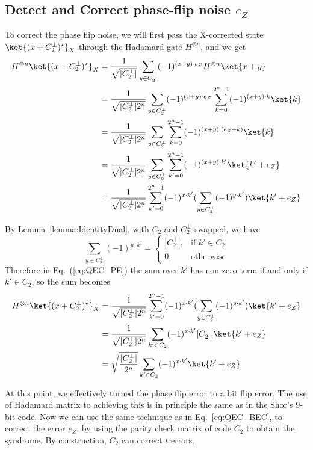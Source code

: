 \subsection{Detect and Correct phase-flip noise \(e_Z\)}
To correct the phase flip noise, we will first pass the X-corrected state \(\ket{(x + C_2^{\perp})^{\star}}_{X}\) through the Hadamard gate \(H^{\otimes n}\), and we get 
\begin{align}
    H^{\otimes n} \ket{(x + C_2^{\perp})^{\star}}_{X} &= \frac{1}{\sqrt{|C_2^{\perp}|}}\sum_{y \in C_2^{\perp}}  (-1)^{(x+y)\cdot e_Z} H^{\otimes n} \ket{x+y} \nonumber \\
    &= \frac{1}{\sqrt{|C_2^{\perp}|2^n}}\sum_{y \in C_2^{\perp}} (-1)^{(x+y)\cdot e_Z} \sum_{k=0}^{2^n-1} (-1)^{(x+y)\cdot k} \ket{k} \nonumber\\
    &= \frac{1}{\sqrt{|C_2^{\perp}|2^n}}\sum_{y \in C_2^{\perp}}\sum_{k=0}^{2^n-1}(-1)^{(x+y)\cdot (e_Z + k)}\ket{k} \nonumber\\
    &= \frac{1}{\sqrt{|C_2^{\perp}|2^n}}\sum_{y \in C_2^{\perp}}\sum_{k'=0}^{2^n-1}(-1)^{(x+y)\cdot k'}\ket{k' + e_Z} \nonumber\\
    &= \frac{1}{\sqrt{|C_2^{\perp}|2^n}}\sum_{k'=0}^{2^n-1}(-1)^{x\cdot k'}(\sum_{y \in C_2^{\perp}}(-1)^{y\cdot k'})\ket{k' + e_Z}\label{eq:QEC_PE}
\end{align}

By Lemma~\ref{lemma:IdentityDual}, with \(C_2\) and \(C_2^{\perp}\) swapped, we have 
\[
\sum_{y \in C_2^{\perp}}(-1)^{y\cdot k'} = 
\begin{cases}
    |C_2^{\perp}|, & \text{if } k' \in C_2\\
    0, & \text{otherwise}
\end{cases}
\]
Therefore in Eq.~(\ref{eq:QEC_PE}) the sum over \(k'\) has non-zero term if and only if  \(k' \in C_2\), so the sum  becomes 
\begin{align}
H^{\otimes n} \ket{(x + C_2^{\perp})^{\star}}_{X} &= \frac{1}{\sqrt{|C_2^{\perp}|2^n}}\sum_{k'=0}^{2^n-1}(-1)^{x\cdot k'}(\sum_{y \in C_2^{\perp}}(-1)^{y\cdot k'})\ket{k' + e_Z} \nonumber \\
&= \frac{1}{\sqrt{|C_2^{\perp}|2^n}}\sum_{k'\in C_2}(-1)^{x\cdot k'} |C_2^{\perp}| \ket{k' + e_Z} \nonumber\\
&= \sqrt{\frac{|C_2^{\perp}|}{2^n}}\sum_{k'\in C_2}(-1)^{x\cdot k'} \ket{k' + e_Z} \label{eq:QEC_PEC}
\end{align}

At this point, we effectively turned the phase flip error to a bit flip error. The use of Hadamard matrix to achieving this is in principle the same as in the Shor's 9-bit code. Now we can use the same technique as in Eq.~\ref{eq:QEC_BEC}, to correct the error \(e_Z\), by using the parity check matrix of code \(C_2\) to obtain the syndrome. By construction, \(C_2\) can correct \(t\) errors. 

